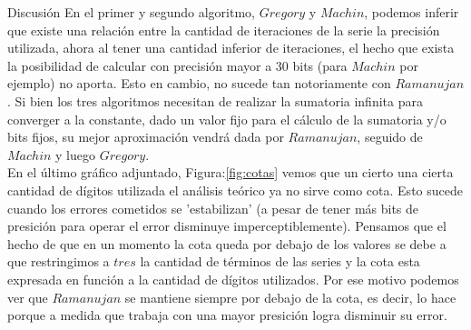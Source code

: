 \begin{section}{Discusión}
	En el primer y segundo algoritmo, $Gregory$ y $Machin$, podemos inferir que existe una relación entre la cantidad de iteraciones de la serie la precisión utilizada, ahora al tener una cantidad inferior de iteraciones, el hecho que exista la posibilidad de calcular con precisión mayor a 30 bits (para $Machin$ por ejemplo) no aporta. Esto en cambio, no sucede tan notoriamente con $Ramanujan$. Si bien los tres algoritmos necesitan de realizar la sumatoria infinita para converger a la constante, dado un valor fijo para el cálculo de la sumatoria y/o bits fijos, su mejor aproximación vendrá dada por $Ramanujan$, seguido de $Machin$ y luego $Gregory$.
	\\
	
	En el último gráfico adjuntado, Figura:\ref{fig:cotas} vemos que un cierto una cierta cantidad de dígitos utilizada el análisis teórico ya no sirve como cota. Esto sucede cuando los errores cometidos se 'estabilizan' (a pesar de tener más bits de presición para operar el error disminuye imperceptiblemente).
	Pensamos que el hecho de que en un momento la cota queda por debajo de los valores se debe a que restringimos a $tres$ la cantidad de términos de las series y la cota esta expresada en función a la cantidad de dígitos utilizados.
	Por ese motivo podemos ver que $Ramanujan$ se mantiene siempre por debajo de la cota, es decir, lo hace porque a medida que trabaja con una mayor presición logra disminuir su error.
\end{section}
